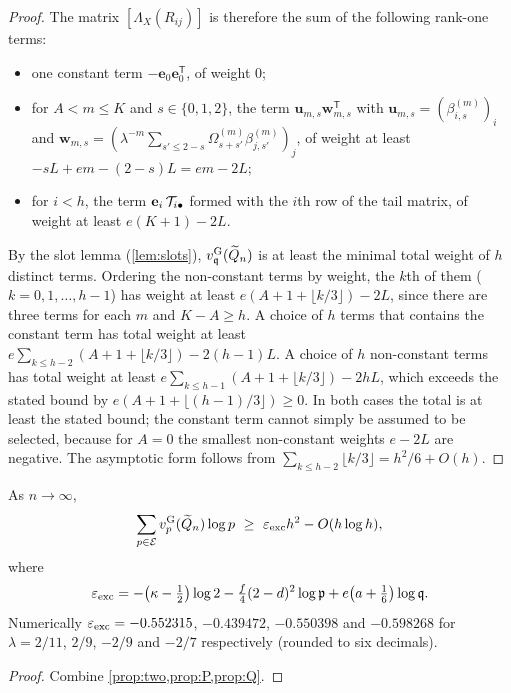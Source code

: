 \begin{proof}
The matrix $[\Lambda_X(R_{ij})]$ is therefore the sum of the following rank-one terms:
\begin{itemize}
\item one constant term $-\mathbf e_0\mathbf e_0^{\mathsf T}$, of weight $0$;
\item for $A<m\le K$ and $s\in\{0,1,2\}$, the term $\mathbf u_{m,s}\mathbf w_{m,s}^{\mathsf T}$ with $\mathbf u_{m,s}=(\beta^{(m)}_{i,s})_i$ and $\mathbf w_{m,s}=(\lambda^{-m}\sum_{s'\le2-s}\Omega^{(m)}_{s+s'}\beta^{(m)}_{j,s'})_j$, of weight at least $-sL+em-(2-s)L=em-2L$;
\item for $i<h$, the term $\mathbf e_i\,\mathcal{T}_{i\bullet}$ formed with the $i$th row of the tail matrix, of weight at least $e(K+1)-2L$.
\end{itemize}
By the slot lemma (\cref{lem:slots}), $v^{\mathrm{G}}_{\mathfrak{q}}(\widetilde{Q}_n)$ is at least the minimal total weight of $h$ distinct terms. Ordering the non-constant terms by weight, the $k$th of them ($k=0,1,\dots,h-1$) has weight at least $e(A+1+\lfloor k/3\rfloor)-2L$, since there are three terms for each $m$ and $K-A\ge h$. A choice of $h$ terms that contains the constant term has total weight at least $e\sum_{k\le h-2}(A+1+\lfloor k/3\rfloor)-2(h-1)L$. A choice of $h$ non-constant terms has total weight at least $e\sum_{k\le h-1}(A+1+\lfloor k/3\rfloor)-2hL$, which exceeds the stated bound by $e(A+1+\lfloor(h-1)/3\rfloor)\ge0$. In both cases the total is at least the stated bound; the constant term cannot simply be assumed to be selected, because for $A=0$ the smallest non-constant weights $e-2L$ are negative. The asymptotic form follows from $\sum_{k\le h-2}\lfloor k/3\rfloor=h^2/6+O(h)$.
\end{proof}

\begin{corollary}\label{cor:exceptional}
As $n\to\infty$,
\[
\sum_{p\in\Ex}\vg p(\Qt_n)\log p\ \ge\ \eps_{\mathrm{exc}}h^2-O(h\log h),
\]
where
\[
\varepsilon_{\mathrm{exc}}=-\bigl(\kappa-\tfrac12\bigr)\log2-\tfrac f4(2-d)^2\log\mathfrak{p}+e\bigl(a+\tfrac16\bigr)\log\mathfrak{q} .
\]
Numerically $\varepsilon_{\mathrm{exc}}=-0.552315$, $-0.439472$, $-0.550398$ and $-0.598268$ for $\lambda=2/11$, $2/9$, $-2/9$ and $-2/7$ respectively (rounded to six decimals).
\end{corollary}

\begin{proof}
Combine \cref{prop:two,prop:P,prop:Q}.
\end{proof}
